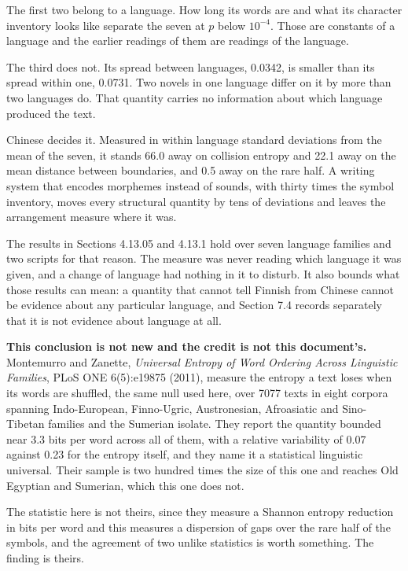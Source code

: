 The first two belong to a language. How long its words are and what its character inventory looks like separate the seven at \(p\) below \(10^{-4}\). Those are constants of a language and the earlier readings of them are readings of the language.

The third does not. Its spread between languages, 0.0342, is smaller than its spread within one, 0.0731. Two novels in one language differ on it by more than two languages do. That quantity carries no information about which language produced the text.

Chinese decides it. Measured in within language standard deviations from the mean of the seven, it stands 66.0 away on collision entropy and 22.1 away on the mean distance between boundaries, and 0.5 away on the rare half. A writing system that encodes morphemes instead of sounds, with thirty times the symbol inventory, moves every structural quantity by tens of deviations and leaves the arrangement measure where it was.

The results in Sections 4.13.05 and 4.13.1 hold over seven language families and two scripts for that reason. The measure was never reading which language it was given, and a change of language had nothing in it to disturb. It also bounds what those results can mean: a quantity that cannot tell Finnish from Chinese cannot be evidence about any particular language, and Section 7.4 records separately that it is not evidence about language at all.

\noindent\textbf{This conclusion is not new and the credit is not this document's.} Montemurro and Zanette, \emph{Universal Entropy of Word Ordering Across Linguistic Families}, PLoS ONE 6(5):e19875 (2011), measure the entropy a text loses when its words are shuffled, the same null used here, over 7077 texts in eight corpora spanning Indo-European, Finno-Ugric, Austronesian, Afroasiatic and Sino-Tibetan families and the Sumerian isolate. They report the quantity bounded near 3.3 bits per word across all of them, with a relative variability of 0.07 against 0.23 for the entropy itself, and they name it a statistical linguistic universal. Their sample is two hundred times the size of this one and reaches Old Egyptian and Sumerian, which this one does not.

The statistic here is not theirs, since they measure a Shannon entropy reduction in bits per word and this measures a dispersion of gaps over the rare half of the symbols, and the agreement of two unlike statistics is worth something. The finding is theirs.

